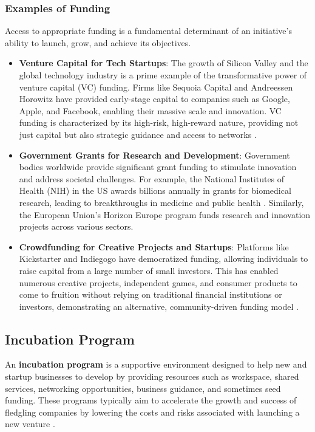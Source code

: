 \documentclass[../Main.tex]{subfiles}
\begin{document}
\subsubsection*{Examples of Funding}
Access to appropriate funding is a fundamental determinant of an initiative's ability to launch, grow, and achieve its objectives.
\begin{itemize}
\item \textbf{Venture Capital for Tech Startups}: The growth of Silicon Valley and the global technology industry is a prime example of the transformative power of venture capital (VC) funding. Firms like Sequoia Capital and Andreessen Horowitz have provided early-stage capital to companies such as Google, Apple, and Facebook, enabling their massive scale and innovation. VC funding is characterized by its high-risk, high-reward nature, providing not just capital but also strategic guidance and access to networks \cite{lerner2012venture}.
\item \textbf{Government Grants for Research and Development}: Government bodies worldwide provide significant grant funding to stimulate innovation and address societal challenges. For example, the National Institutes of Health (NIH) in the US awards billions annually in grants for biomedical research, leading to breakthroughs in medicine and public health \cite{NIH2024}. Similarly, the European Union's Horizon Europe program funds research and innovation projects across various sectors.
\item \textbf{Crowdfunding for Creative Projects and Startups}: Platforms like Kickstarter and Indiegogo have democratized funding, allowing individuals to raise capital from a large number of small investors. This has enabled numerous creative projects, independent games, and consumer products to come to fruition without relying on traditional financial institutions or investors, demonstrating an alternative, community-driven funding model \cite{mollick2014dynamics}.
\end{itemize}

\subsection{Incubation Program}
An \textbf{incubation program} is a supportive environment designed to help new and startup businesses to develop by providing resources such as workspace, shared services, networking opportunities, business guidance, and sometimes seed funding. These programs typically aim to accelerate the growth and success of fledgling companies by lowering the costs and risks associated with launching a new venture \cite{hackett2004business, europeancommission2014incubators}.
\end{document}
